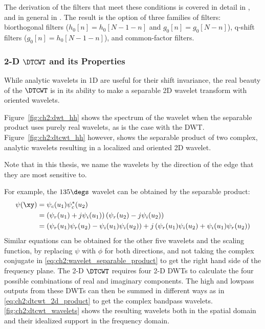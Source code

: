   The derivation of the filters that meet these conditions is covered in
  detail in \cite{kingsbury_complex_2001, kingsbury_design_2003}, and in
  general in \cite{selesnick_dual-tree_2005}. The result is the
  option of three families of filters:  biorthogonal filters ($h_0[n] =
  h_0[N-1-n]$ and $g_0[n] = g_0[N-n]$), q-shift filters ($g_0[n]
  = h_0[N-1-n]$), and common-factor filters. 
  
\subsubsection{2-D $\DTCWT$ and its Properties}
  While analytic wavelets in 1D are useful for their shift invariance, the real
  beauty of the $\DTCWT$ is in its ability to make a separable 2D wavelet
  transform with oriented wavelets. 
  
  Figure~\autoref{fig:ch2:dwt_hh} shows the spectrum of
  the wavelet when the separable product uses purely real wavelets, as is the
  case with the DWT\@. Figure~\autoref{fig:ch2:dtcwt_hh} however, shows the separable
  product of two complex, analytic wavelets resulting in a localized and
  oriented 2D wavelet. 

  Note that in this thesis, we name the wavelets by the direction of the edge
  that they are most sensitive to. 
  
  For example, the $135\degs$ wavelet can be obtained by the separable product:
  \begin{align}
    \psi(\xy) &= \psi_c(u_1) \psi_c^*(u_2) \label{eq:ch2:wavelet_separable_product}\\
              &= \left(\psi_r(u_1) + j\psi_i(u_1)\right) 
                 \left(\psi_r(u_2) - j\psi_i(u_2)\right) \\
              &= \left(\psi_r(u_1)\psi_r(u_2) - \psi_i(u_1)\psi_i(u_2)\right) 
                +j \left(\psi_r(u_1)\psi_i(u_2) + \psi_i(u_1)\psi_r(u_2)\right) 
                \label{eq:ch2:dtcwt_2d_product}
  \end{align}
  Similar equations can be obtained for the other five wavelets and the scaling
  function, by replacing
  $\psi$ with $\phi$ for both directions, and not taking the complex conjugate
  in \eqref{eq:ch2:wavelet_separable_product} to get the right hand side of the
  frequency plane. The 2-D $\DTCWT$ requires four 2-D DWTs to calculate the four
  possible combinations of real and imaginary components. The high and lowpass
  outputs from these DWTs can then be summed in different ways as in
  \eqref{eq:ch2:dtcwt_2d_product} to get the complex bandpass wavelets.
  \autoref{fig:ch2:dtcwt_wavelets} shows the resulting wavelets both in the spatial
  domain and their idealized support in the frequency domain.

